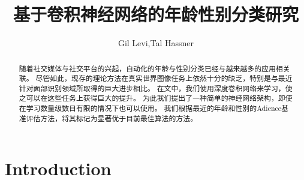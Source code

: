 \documentclass{article}
\author{Gil Levi,Tal Hassner}
\title{基于卷积神经网络的年龄性别分类研究}
\begin{document}
\begin{abstract}
随着社交媒体与社交平台的兴起，自动化的年龄与性别分类已经与越来越多的应用相关联。
尽管如此，现存的理论方法在真实世界图像任务上依然十分的缺乏，特别是与最近针对面部识别领域所取得的巨大进步相比。
在文中，我们使用深度卷积网络来学习，使之可以在这些任务上获得巨大的提升。
为此我们提出了一种简单的神经网络架构，即使在学习数量级数目有限的情况下也可以使用。
我们根据最近的年龄和性别的Adience基准评估方法，将其标记为显著优于目前最佳算法的方法。
\end{abstract}

\section{Introduction}
\end{document}

